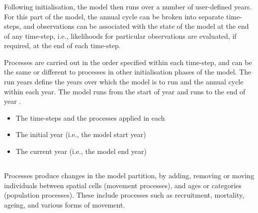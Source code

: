 \subsubsection{}

Following initialisation, the model then runs over a number of user-defined years. For this part of the model, the annual cycle can be broken into separate time-steps, and observations can be associated with the state of the model at the end of any time-step, i.e., likelihoods for particular observations are evaluated, if required, at the end of each time-step. 

Processes are carried out in the order specified within each time-step, and can be the same or different to processes in other initialisation phases of the model. The run years define the years over which the model is to run and the annual cycle within each year. The model runs from the start of year  and runs to the end of year . %

\begin{itemize}
  \item The time-steps and the processes applied in each
  \item The initial year (i.e., the model start year)
  \item The current year (i.e., the model end year)
\end{itemize}

%

\subsection{}

Processes produce changes in the model partition, by adding, removing or moving individuals between spatial cells (movement processes), and ages or categories (population processes). These include processes such as recruitment, mortality, ageing, and various forms of movement.

